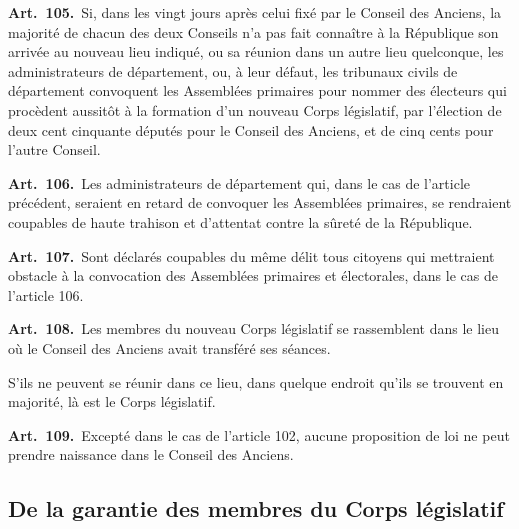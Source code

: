 \documentclass[french,twoside]{book} %
\newcommand{\labelchar}[1]{\textbf{\color{rubric} #1}}
\begin{document}
\labelchar{Art. 105.} Si, dans les vingt jours après celui fixé par le Conseil des Anciens, la majorité de chacun des deux Conseils n’a pas fait connaître à la République son arrivée au nouveau lieu indiqué, ou sa réunion dans un autre lieu quelconque, les administrateurs de département, ou, à leur défaut, les tribunaux civils de département convoquent les Assemblées primaires pour nommer des électeurs qui procèdent aussitôt à la formation d’un nouveau Corps législatif, par l’élection de deux cent cinquante députés pour le Conseil des Anciens, et de cinq cents pour l’autre Conseil.\par
\labelchar{Art. 106.} Les administrateurs de département qui, dans le cas de l’article précédent, seraient en retard de convoquer les Assemblées primaires, se rendraient coupables de haute trahison et d’attentat contre la sûreté de la République.\par
\labelchar{Art. 107.} Sont déclarés coupables du même délit tous citoyens qui mettraient obstacle à la convocation des Assemblées primaires et électorales, dans le cas de l’article 106.\par
\labelchar{Art. 108.} Les membres du nouveau Corps législatif se rassemblent dans le lieu où le Conseil des Anciens avait transféré ses séances.\par
S’ils ne peuvent se réunir dans ce lieu, dans quelque endroit qu’ils se trouvent en majorité, là est le Corps législatif.\par
\labelchar{Art. 109.} Excepté dans le cas de l’article 102, aucune proposition de loi ne peut prendre naissance dans le Conseil des Anciens.

\subsection[{De la garantie des membres du Corps législatif}]{De la garantie des membres du Corps législatif}
\end{document}
